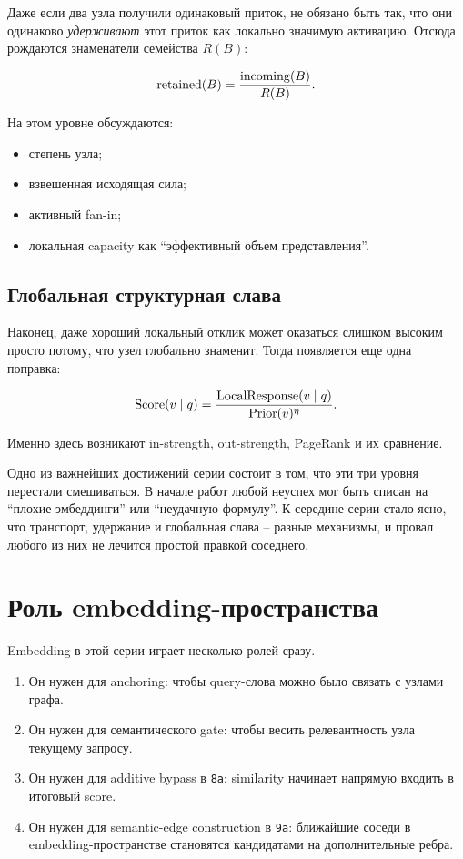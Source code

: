 Даже если два узла получили одинаковый приток, не обязано быть так, что они
одинаково \emph{удерживают} этот приток как локально значимую активацию. Отсюда
рождаются знаменатели семейства $R(B)$:

\[
\mathrm{retained}(B)=\frac{\mathrm{incoming}(B)}{R(B)}.
\]

На этом уровне обсуждаются:

\begin{itemize}[leftmargin=2em]
\item степень узла;
\item взвешенная исходящая сила;
\item активный fan-in;
\item локальная capacity как ``эффективный объем представления''.
\end{itemize}

\subsection{Глобальная структурная слава}

Наконец, даже хороший локальный отклик может оказаться слишком высоким просто
потому, что узел глобально знаменит. Тогда появляется еще одна поправка:

\[
\mathrm{Score}(v\mid q)=\frac{\text{LocalResponse}(v\mid q)}{\text{Prior}(v)^\eta}.
\]

Именно здесь возникают in-strength, out-strength, PageRank и их сравнение.

\begin{takeaway}
Одно из важнейших достижений серии состоит в том, что эти три уровня перестали
смешиваться. В начале работ любой неуспех мог быть списан на ``плохие
эмбеддинги'' или ``неудачную формулу''. К середине серии стало ясно, что
транспорт, удержание и глобальная слава -- разные механизмы, и провал любого из
них не лечится простой правкой соседнего.
\end{takeaway}

\section{Роль embedding-пространства}

Embedding в этой серии играет несколько ролей сразу.

\begin{enumerate}[leftmargin=2em]
\item Он нужен для anchoring: чтобы query-слова можно было связать с узлами
графа.
\item Он нужен для семантического gate: чтобы весить релевантность узла текущему
запросу.
\item Он нужен для additive bypass в \texttt{8a}: similarity начинает напрямую
входить в итоговый score.
\item Он нужен для semantic-edge construction в \texttt{9a}: ближайшие соседи в
embedding-пространстве становятся кандидатами на дополнительные ребра.
\end{enumerate}

